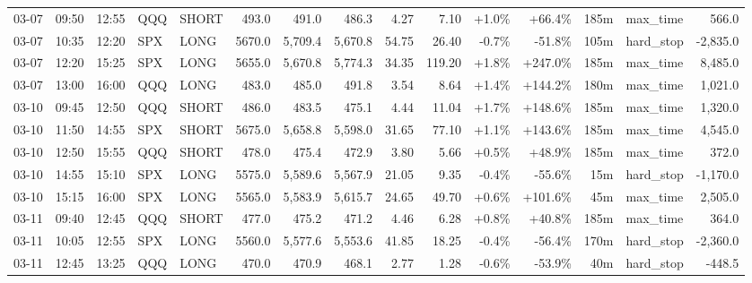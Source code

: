 \documentclass[11pt,a4paper,twoside]{article}
\begin{document}
\begin{landscape}
\begin{center}
\begin{longtable}{>{\color{txtmain}}l l l l l r r r r r r r r >{\color{txtmain}}l r}
03-07 & 09:50 & 12:55 & QQQ & SHORT & 493.0 & 491.0 & 486.3 & 4.27 & 7.10 & \textcolor{wingreen}{+1.0\%} & \textcolor{wingreen}{+66.4\%} & 185m & max\_time & \textcolor{wingreen}{566.0} \\
03-07 & 10:35 & 12:20 & SPX & LONG & 5670.0 & 5,709.4 & 5,670.8 & 54.75 & 26.40 & \textcolor{lossred}{-0.7\%} & \textcolor{lossred}{-51.8\%} & 105m & hard\_stop & \textcolor{lossred}{-2,835.0} \\
03-07 & 12:20 & 15:25 & SPX & LONG & 5655.0 & 5,670.8 & 5,774.3 & 34.35 & 119.20 & \textcolor{wingreen}{+1.8\%} & \textcolor{wingreen}{+247.0\%} & 185m & max\_time & \textcolor{wingreen}{8,485.0} \\
03-07 & 13:00 & 16:00 & QQQ & LONG & 483.0 & 485.0 & 491.8 & 3.54 & 8.64 & \textcolor{wingreen}{+1.4\%} & \textcolor{wingreen}{+144.2\%} & 180m & max\_time & \textcolor{wingreen}{1,021.0} \\
03-10 & 09:45 & 12:50 & QQQ & SHORT & 486.0 & 483.5 & 475.1 & 4.44 & 11.04 & \textcolor{wingreen}{+1.7\%} & \textcolor{wingreen}{+148.6\%} & 185m & max\_time & \textcolor{wingreen}{1,320.0} \\
03-10 & 11:50 & 14:55 & SPX & SHORT & 5675.0 & 5,658.8 & 5,598.0 & 31.65 & 77.10 & \textcolor{wingreen}{+1.1\%} & \textcolor{wingreen}{+143.6\%} & 185m & max\_time & \textcolor{wingreen}{4,545.0} \\
03-10 & 12:50 & 15:55 & QQQ & SHORT & 478.0 & 475.4 & 472.9 & 3.80 & 5.66 & \textcolor{wingreen}{+0.5\%} & \textcolor{wingreen}{+48.9\%} & 185m & max\_time & \textcolor{wingreen}{372.0} \\
03-10 & 14:55 & 15:10 & SPX & LONG & 5575.0 & 5,589.6 & 5,567.9 & 21.05 & 9.35 & \textcolor{lossred}{-0.4\%} & \textcolor{lossred}{-55.6\%} & 15m & hard\_stop & \textcolor{lossred}{-1,170.0} \\
03-10 & 15:15 & 16:00 & SPX & LONG & 5565.0 & 5,583.9 & 5,615.7 & 24.65 & 49.70 & \textcolor{wingreen}{+0.6\%} & \textcolor{wingreen}{+101.6\%} & 45m & max\_time & \textcolor{wingreen}{2,505.0} \\
03-11 & 09:40 & 12:45 & QQQ & SHORT & 477.0 & 475.2 & 471.2 & 4.46 & 6.28 & \textcolor{wingreen}{+0.8\%} & \textcolor{wingreen}{+40.8\%} & 185m & max\_time & \textcolor{wingreen}{364.0} \\
03-11 & 10:05 & 12:55 & SPX & LONG & 5560.0 & 5,577.6 & 5,553.6 & 41.85 & 18.25 & \textcolor{lossred}{-0.4\%} & \textcolor{lossred}{-56.4\%} & 170m & hard\_stop & \textcolor{lossred}{-2,360.0} \\
03-11 & 12:45 & 13:25 & QQQ & LONG & 470.0 & 470.9 & 468.1 & 2.77 & 1.28 & \textcolor{lossred}{-0.6\%} & \textcolor{lossred}{-53.9\%} & 40m & hard\_stop & \textcolor{lossred}{-448.5} \\

\end{longtable}
\end{center}
\end{landscape}
\end{document}
